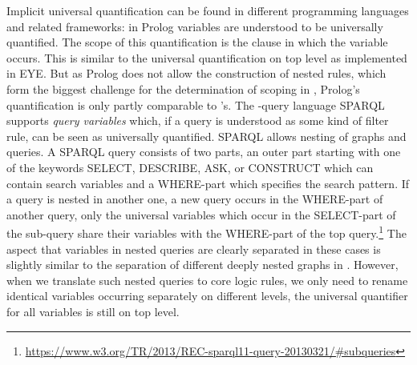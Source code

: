 Implicit universal quantification can be found in different programming languages and \rdf related frameworks:
in Prolog \cite{Prolog} variables are understood to be universally quantified. The scope of this quantification is the clause in which the variable occurs. This 
is similar to the universal quantification on top level as implemented in EYE.
But as Prolog does not allow the construction of nested rules, 
which form the biggest challenge for the determination of scoping in \nthree, Prolog's quantification is only partly comparable to \nthree's. 
%
The \rdf-query language SPARQL \cite{sparql} supports \emph{query variables} which, if a query is understood as some kind of filter rule, can be seen as universally quantified. 
SPARQL allows nesting of graphs and queries. A SPARQL query consists of two parts, an outer part starting with one of the keywords SELECT, DESCRIBE, ASK, or CONSTRUCT 
which can contain search variables and a WHERE-part which specifies 
the search pattern. If a query is nested in another one, \ie a new query occurs in the WHERE-part of another query, only the universal variables which occur in the SELECT-part of the 
sub-query share their variables with the WHERE-part of the top query.\footnote{\url{https://www.w3.org/TR/2013/REC-sparql11-query-20130321/\#subqueries}} 
The aspect that variables in nested queries are clearly separated in these cases is slightly similar to the separation of different deeply nested graphs in \nthree.
However, when we translate such nested queries to core logic rules, we only need to rename identical variables occurring separately on different levels, the universal quantifier for all variables 
is still on top level.

